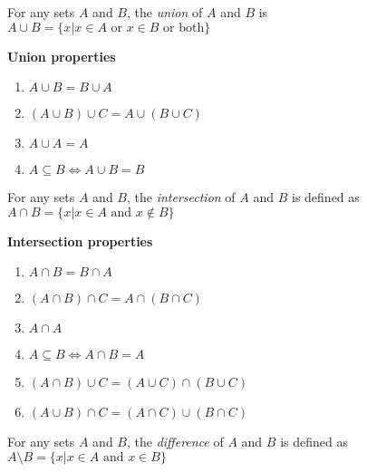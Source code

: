 \begin{definition}
	For any sets $A$ and $B$, the \textit{union} of $A$ and $B$ is $A \cup B =
		\{x| x \in A \text{ or } x \in B \text{ or both}\}$
\end{definition}

\textbf{Union properties}
\begin{enumerate}
	\item $A \cup B = B \cup A$
	\item $(A \cup B) \cup C = A \cup (B \cup C)$
	\item $A \cup A = A$
	\item $A \subseteq B \iff A \cup B  = B$
\end{enumerate}

\begin{definition}
	For any sets $A$ and $B$, the \textit{intersection} of $A$ and $B$ is defined as $A
		\cap B = \{x| x \in A \text{ and } x \not\in B\}$
\end{definition}

\textbf{Intersection properties}
\begin{enumerate}
	\item $A \cap B = B \cap A$
	\item $(A \cap B) \cap C = A \cap (B \cap C)$
	\item $A \cap A$
	\item $A \subseteq B \iff A \cap B = A$
	\item $(A \cap B) \cup C = (A \cup C) \cap (B \cup C)$
	\item $(A \cup B) \cap C = (A \cap C) \cup (B \cap C)$
\end{enumerate}

\begin{definition}
	For any sets $A$ and $B$, the \textit{difference} of $A$ and $B$ is defined
	as $A \setminus B = \{x | x \in A
		\text{ and } x \in B\}$
\end{definition}

